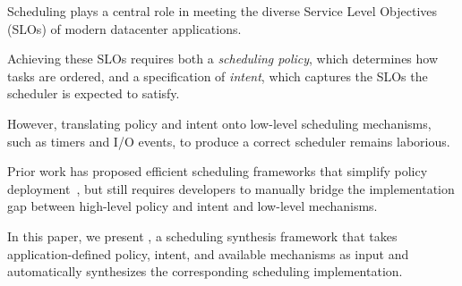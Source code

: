 Scheduling plays a central role in meeting the diverse Service Level Objectives (SLOs) of modern datacenter applications.

Achieving these SLOs requires both a \textit{scheduling policy}, which determines how tasks are ordered, and a specification of \textit{intent}, which captures the SLOs the scheduler is expected to satisfy.

However, translating policy and intent onto low-level scheduling mechanisms, such as timers and I/O events, to produce a correct scheduler remains laborious.

Prior work has proposed efficient scheduling frameworks that simplify policy deployment~\cite{humphries2021ghost, linux-sched-ext}, but still requires developers to manually bridge the implementation gap between high-level policy and intent and low-level mechanisms.

In this paper, we present \sysname, a scheduling synthesis framework that takes application-defined policy, intent, and available mechanisms as input and automatically synthesizes the corresponding scheduling implementation.
